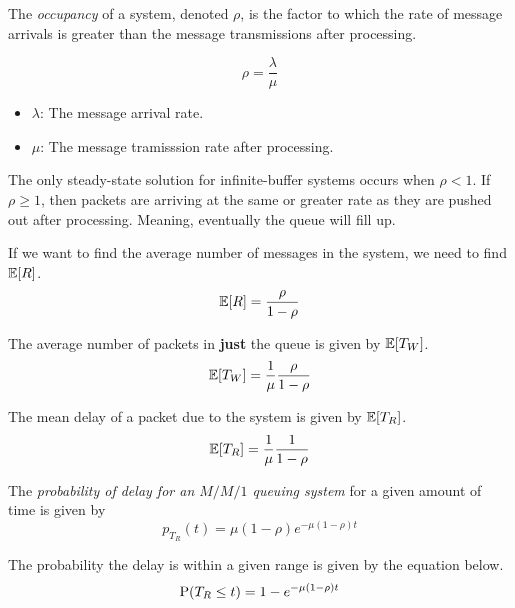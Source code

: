 \begin{definition}[Occupancy]\label{def:Occupancy}
  The \emph{occupancy} of a system, denoted $\rho$, is the factor to which the rate of message arrivals is greater than the message transmissions after processing.

  \begin{equation}\label{eq:Occupancy}
    \rho = \frac{\lambda}{\mu}
  \end{equation}
  \begin{itemize}[noitemsep]
  \item $\lambda$: The message arrival rate.
  \item $\mu$: The message tramisssion rate after processing.
  \end{itemize}

  \begin{remark}
    The only steady-state solution for infinite-buffer systems occurs when $\rho < 1$.
    If $\rho \geq 1$, then packets are arriving at the same or greater rate as they are pushed out after processing.
    Meaning, eventually the queue will fill up.
  \end{remark}
\end{definition}

If we want to find the average number of messages in the system, we need to find $\operatorname{\operatorname{\mathbb{E}}}[R]$.
\begin{equation}\label{eq:Mean_Packets_in_Whole_System}
  \operatorname{\operatorname{\mathbb{E}}}[R] = \frac{\rho}{1-\rho}
\end{equation}

The average number of packets in \textbf{just} the queue is given by $\operatorname{\operatorname{\mathbb{E}}}[T_{W}]$.
\begin{equation}\label{eq:Mean_Packets_in_Queue}
  \operatorname{\operatorname{\mathbb{E}}}[T_{W}] = \frac{1}{\mu} \frac{\rho}{1-\rho}
\end{equation}

The mean delay of a packet due to the system is given by $\operatorname{\operatorname{\mathbb{E}}}[T_{R}]$.
\begin{equation}\label{eq:Mean_Packet_Delay}
  \operatorname{\operatorname{\mathbb{E}}}[T_{R}] = \frac{1}{\mu} \frac{1}{1-\rho}
\end{equation}

\begin{definition}\label{def:MM1_Prob_Delay}
  The \emph{probability of delay for an $M/M/1$ queuing system} for a given amount of time is given by
  \begin{equation}\label{eq:MM1_Delay}
    p_{T_{R}}(t) = \mu (1-\rho) e^{-\mu (1-\rho) t}
  \end{equation}

  The probability the delay is within a given range is given by the equation below.
  \begin{equation}
    \label{eq:9}
    \operatorname{\operatorname{P}}(T_{R} \leq t) = 1 - e^{-\mu (1-\rho) t}
  \end{equation}
\end{definition}

